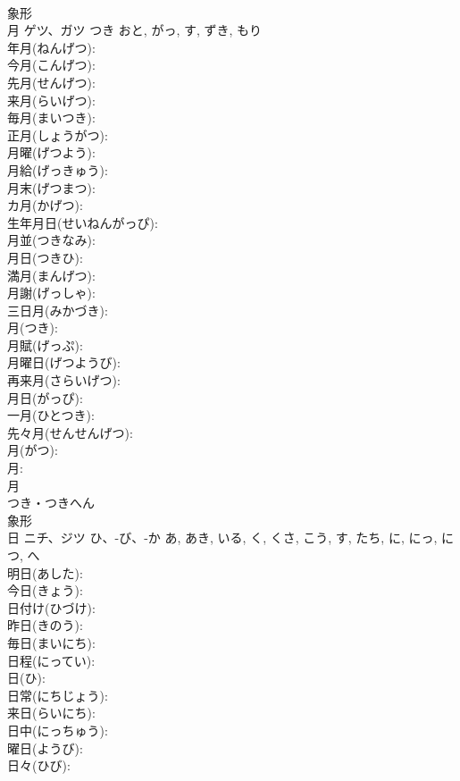 \documentclass[8pt]{extreport}
\begin{document}
\begin{CJK}{UTF8}{min}
\\	象形 
\\	月	ゲツ、ガツ	つき	おと, がっ, す, ずき, もり	
\\	年月(ねんげつ): 
\\	今月(こんげつ): 
\\	先月(せんげつ): 
\\	来月(らいげつ): 
\\	毎月(まいつき): 
\\	正月(しょうがつ): 
\\	月曜(げつよう): 
\\	月給(げっきゅう): 
\\	月末(げつまつ): 
\\	カ月(かげつ): 
\\	生年月日(せいねんがっぴ): 
\\	月並(つきなみ): 
\\	月日(つきひ): 
\\	満月(まんげつ): 
\\	月謝(げっしゃ): 
\\	三日月(みかづき): 
\\	月(つき): 
\\	月賦(げっぷ): 
\\	月曜日(げつようび): 
\\	再来月(さらいげつ): 
\\	月日(がっぴ): 
\\	一月(ひとつき): 
\\	先々月(せんせんげつ): 
\\	月(がつ): 
\\	月: 
\\	月	
\\	つき・つきへん	
\\	象形 
\\	日	ニチ、ジツ	ひ、-び、-か	あ, あき, いる, く, くさ, こう, す, たち, に, にっ, につ, へ	
\\	明日(あした): 
\\	今日(きょう): 
\\	日付け(ひづけ): 
\\	昨日(きのう): 
\\	毎日(まいにち): 
\\	日程(にってい): 
\\	日(ひ): 
\\	日常(にちじょう): 
\\	来日(らいにち): 
\\	日中(にっちゅう): 
\\	曜日(ようび): 
\\	日々(ひび): 

\end{CJK}
\end{document}
